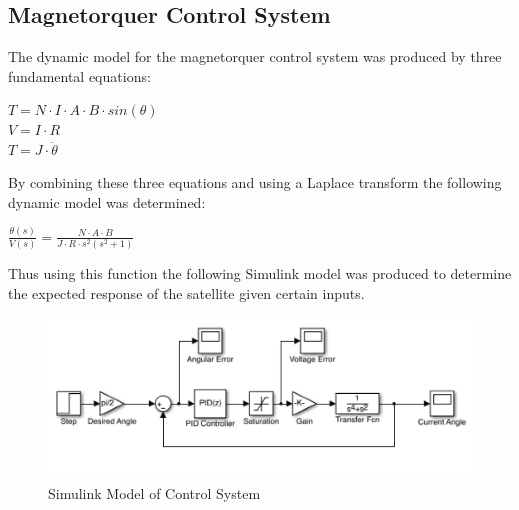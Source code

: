 \subsection{Magnetorquer Control System}
The dynamic model for the magnetorquer control system was produced by three fundamental equations:
\begin{center}
$T = N \cdot I \cdot A \cdot B \cdot sin(\theta)$ \vspace{2mm} \\
$V = I \cdot R$\vspace{2mm}\\
$T = J \cdot \ddot{\theta}$\\
\end{center}
By combining these three equations and using a Laplace transform the following dynamic model was determined:
\begin{center}
$\frac{\theta(s)}{V(s)} = \frac{N \cdot A \cdot B}{J \cdot R \cdot s^2 (s^2 + 1)}$
\end{center}
Thus using this function the following Simulink model was produced to determine the expected response of the satellite given certain inputs.

\vspace{-6mm}
\begin{center}
\begin{figure}[H]
\caption{Simulink Model of Control System}
\vspace{-4mm}
\centering
\includegraphics[scale = 0.8]{Simulink_ADCS_Model.png}
\end{figure}
\end{center}
\vspace{-5mm}

